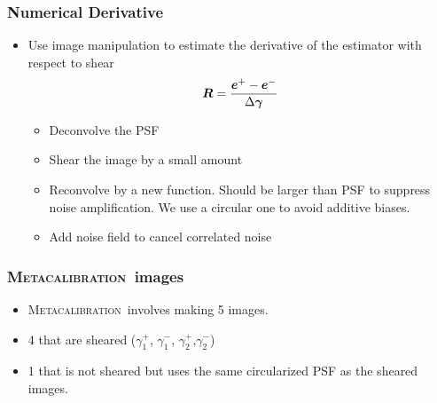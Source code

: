 \documentclass{beamer}
\newcommand{\Mcal}{\textsc{Metacalibration}}
\newcommand{\mcalR}{\mbox{\boldmath $R$}}
\newcommand{\vecg}{\mbox{\boldmath $\gamma$}}
\newcommand{\vest}{\mbox{\boldmath $e$}}
\begin{document}
\frame
{
    \frametitle{Numerical Derivative}

 

       \begin{itemize}

        \item Use image manipulation to estimate the derivative of the
            estimator with respect to shear
            {\color{gold}
                \begin{equation}
                    \mcalR = \frac{\vest^+ - \vest^-}{\Delta \vecg} \nonumber 
                \end{equation}
            }
            \begin{itemize}
                \item Deconvolve the PSF
                \item Shear the image by a small amount
                \item Reconvolve by a new function.  Should be larger than PSF to suppress
                    noise amplification.  We use a circular one to avoid
                    additive biases.

                \item {\color{lightsteelblue} Add noise field to cancel correlated noise}
            \end{itemize}


    \end{itemize}

}

\frame
{
    \frametitle{\Mcal\ images}

 

    \begin{itemize}
        \item \Mcal\ involves making 5 images.
        \item 4 that are sheared 
            ($\gamma_1^+$, $\gamma_1^-$, $\gamma_2^+$,$\gamma_2^-$)
        \item 1 that is not sheared but uses the same circularized
            PSF as the sheared images.


    \end{itemize}

}
\end{document}
